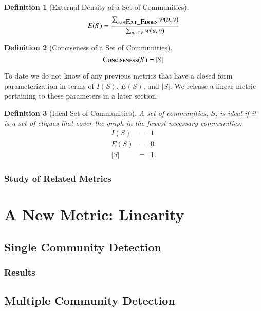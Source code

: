 \documentclass[phd,tocprelim]{cornell}
\newtheorem{definition}{Definition}
\begin{document}
\begin{definition}[External Density of a Set of Communities]
\begin{equation}
E(S) = \frac{\sum_{u, v \in \mbox{\sc Ext\_Edges}} w(u,v)} {\sum_{u,v \in V}w(u,v)}
\end{equation}
\label{def_ext_set}
\end{definition}

\begin{definition}[Conciseness of a Set of Communities]
\begin{equation}
\mbox{\sc Conciseness}(S) = |S|
\end{equation}
\label{def_conciseness}
\end{definition}


To date we do not know of any previous metrics that have a closed form parameterization in terms of $I(S)$, $E(S)$, and $|S|$. We release a linear metric pertaining to these parameters in a later section.
\begin{definition}[Ideal Set of Communities]
A set of communities, $S$, is ideal if it is a set of cliques that cover the graph in the fewest necessary communities:
\begin{eqnarray*}
I(S) &=& 1\\
 E(S) &=& 0 \\
|S| &=& 1.
\end{eqnarray*}
\end{definition}

\subsection{Study of Related Metrics}

\chapter{A New Metric: Linearity}

\section{Single Community Detection}

\subsection{Results}

\section{Multiple Community Detection}
\end{document}
